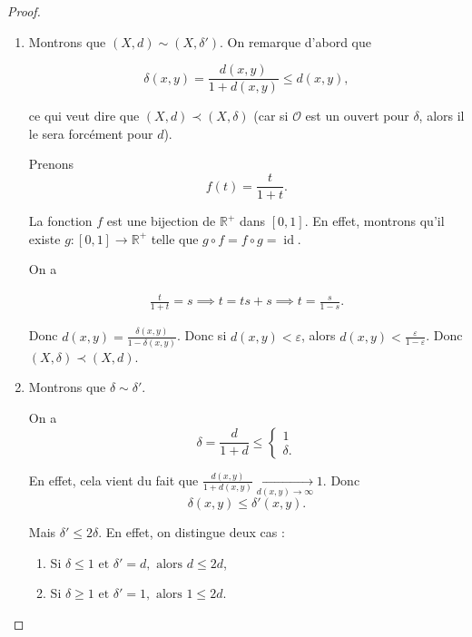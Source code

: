 \documentclass[french]{book}
\theoremstyle{definition}
\theoremstyle{remark}
\newcommand{\lesss}{<}
\newcommand{\less}{\lesss}
\begin{document}
\begin{proof}

  \

  \begin{enumerate}
    \item Montrons que \((X, d) \sim (X, \delta')\). On remarque d'abord que

    \[\delta(x,y) = \frac{d(x,y)}{1+ d(x,y)} \leq d(x,y), \]

    ce qui veut dire que \((X, d) \prec (X, \delta)\) (car si \(\mathcal{O}\) est un ouvert pour \(\delta\), alors il le sera forcément pour \(d\)).

    Prenons
    \begin{equation}\label{bij-dist}
      f(t) = \frac{t}{1+t}.
    \end{equation}

    La fonction \(f\) est une bijection de \(\mathbb{R} ^{+}\) dans \([0, 1]\). En effet, montrons qu'il existe \(g : [0, 1] \to \mathbb{R} ^{+}\) telle que $g \circ f = f \circ g = \operatorname{id}$.

    On a

    \begin{gather*}
      \frac{t}{1+t} = s \implies t = ts+s \implies t = \frac{s}{1-s}.
    \end{gather*}

    Donc \(d(x,y) = \frac{\delta(x,y)}{1 - \delta(x,y)}\). Donc si \(d(x,y) \less \varepsilon\), alors \(d(x,y) \less \frac{\varepsilon}{1- \varepsilon}\). Donc \((X,\delta) \prec (X,d)\).

    \item Montrons que \(\delta \sim \delta'\).

    On a \[\delta = \frac{d}{1+d} \leq \begin{cases}
      1 \\
      \delta.
    \end{cases}\]

    En effet, cela vient du fait que \(\frac{d(x,y)}{1+d(x,y)} \underset{d(x,y) \to \infty }{\longrightarrow} 1\). Donc \[\delta(x,y) \leq \delta'(x,y).\]

    Mais \(\delta' \leq 2 \delta\). En effet, on distingue deux cas :

    \begin{enumerate}
      \item Si \(\delta \leq  1 \text{ et } \delta' = d, \text{ alors } d \leq 2 d \),
      \item Si \(\delta \geq  1 \text{ et } \delta' = 1, \text{ alors } 1 \leq 2 d \).
    \end{enumerate}


\end{enumerate}
\end{proof}
\end{document}
